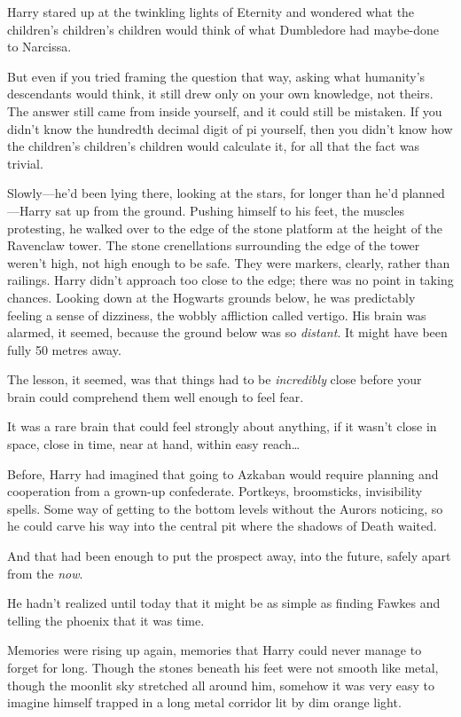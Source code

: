 Harry stared up at the twinkling lights of Eternity and wondered what the children’s children’s children would think of what Dumbledore had maybe-done to Narcissa.

But even if you tried framing the question that way, asking what humanity’s descendants would think, it still drew only on your own knowledge, not theirs. The answer still came from inside yourself, and it could still be mistaken. If you didn’t know the hundredth decimal digit of pi yourself, then you didn’t know how the children’s children’s children would calculate it, for all that the fact was trivial.

\later

Slowly—he’d been lying there, looking at the stars, for longer than he’d planned—Harry sat up from the ground. Pushing himself to his feet, the muscles protesting, he walked over to the edge of the stone platform at the height of the Ravenclaw tower. The stone crenellations surrounding the edge of the tower weren’t high, not high enough to be safe. They were markers, clearly, rather than railings. Harry didn’t approach too close to the edge; there was no point in taking chances. Looking down at the Hogwarts grounds below, he was predictably feeling a sense of dizziness, the wobbly affliction called vertigo. His brain was alarmed, it seemed, because the ground below was so \emph{distant}. It might have been fully 50 metres away.

The lesson, it seemed, was that things had to be \emph{incredibly} close before your brain could comprehend them well enough to feel fear.

It was a rare brain that could feel strongly about anything, if it wasn’t close in space, close in time, near at hand, within easy reach…

Before, Harry had imagined that going to Azkaban would require planning and cooperation from a grown-up confederate. Portkeys, broomsticks, invisibility spells. Some way of getting to the bottom levels without the Aurors noticing, so he could carve his way into the central pit where the shadows of Death waited.

And that had been enough to put the prospect away, into the future, safely apart from the \emph{now}.

He hadn’t realized until today that it might be as simple as finding Fawkes and telling the phoenix that it was time.

Memories were rising up again, memories that Harry could never manage to forget for long. Though the stones beneath his feet were not smooth like metal, though the moonlit sky stretched all around him, somehow it was very easy to imagine himself trapped in a long metal corridor lit by dim orange light.

